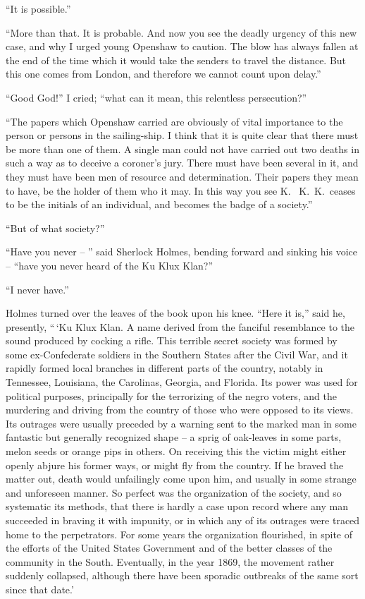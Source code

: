 “It is possible.”

“More than that. It is probable. And now you see the
deadly urgency of this new case, and why I urged young Openshaw
to caution. The blow has always fallen at the end of
the time which it would take the senders to travel the distance.
But this one comes from London, and therefore we cannot
count upon delay.”

“Good God!” I cried; “what can it mean, this relentless
persecution?”

“The papers which Openshaw carried are obviously of vital
importance to the person or persons in the sailing-ship. I
think that it is quite clear that there must be more than one
of them. A single man could not have carried out two deaths
in such a way as to deceive a coroner’s jury. There must
have been several in it, and they must have been men of resource
and determination. Their papers they mean to have,
be the holder of them who it may. In this way you see K.\ %
K.\ K.\ ceases to be the initials of an individual, and becomes
the badge of a society.”

“But of what society?”

“Have you never -- ” said Sherlock Holmes, bending forward
and sinking his voice -- “have you never heard of the
Ku Klux Klan?”

“I never have.”

Holmes turned over the leaves of the book upon his knee.
“Here it is,” said he, presently, “\,‘Ku Klux Klan. A name
derived from the fanciful resemblance to the sound produced
by cocking a rifle. This terrible secret society was formed by
some ex-Confederate soldiers in the Southern States after the
Civil War, and it rapidly formed local branches in different
parts of the country, notably in Tennessee, Louisiana, the
Carolinas, Georgia, and Florida. Its power was used for political
purposes, principally for the terrorizing of the negro
voters, and the murdering and driving from the country of
those who were opposed to its views. Its outrages were usually
preceded by a warning sent to the marked man in some
fantastic but generally recognized shape -- a sprig of oak-leaves
in some parts, melon seeds or orange pips in others. On receiving
this the victim might either openly abjure his former
ways, or might fly from the country. If he braved the matter
out, death would unfailingly come upon him, and usually in
some strange and unforeseen manner. So perfect was the organization
of the society, and so systematic its methods, that
there is hardly a case upon record where any man succeeded
in braving it with impunity, or in which any of its outrages
were traced home to the perpetrators. For some years
the organization flourished, in spite of the efforts of the
United States Government and of the better classes of the
community in the South. Eventually, in the year 1869,
the movement rather suddenly collapsed, although there
have been sporadic outbreaks of the same sort since that
date.’

